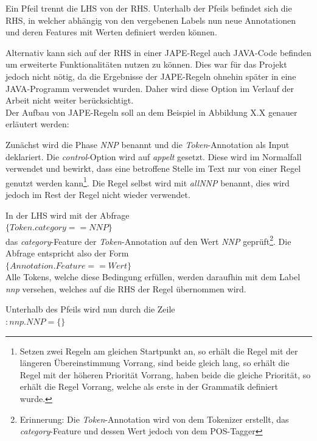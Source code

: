 \documentclass[12pt]{report}
\begin{document}
Ein Pfeil trennt die LHS von der RHS. Unterhalb der Pfeils befindet sich die RHS, in welcher abhängig von den vergebenen Labels nun neue Annotationen und deren Features mit Werten definiert werden können. 

Alternativ kann sich auf der RHS in einer JAPE-Regel auch JAVA-Code befinden um erweiterte Funktionalitäten nutzen zu können. Dies war für das Projekt jedoch nicht nötig, da die Ergebnisse der JAPE-Regeln ohnehin später in eine JAVA-Programm verwendet wurden. Daher wird diese Option im Verlauf der Arbeit nicht weiter berücksichtigt. \\ 

Der Aufbau von JAPE-Regeln soll an dem Beispiel in Abbildung X.X genauer erläutert werden:

Zunächst wird die Phase \textit{NNP} benannt und die \textit{Token}-Annotation als Input deklariert. Die \textit{control}-Option wird auf \textit{appelt} gesetzt. Diese wird im Normalfall verwendet und bewirkt, dass eine betroffene Stelle im Text nur von einer Regel genutzt werden kann\footnote{Setzen zwei Regeln am gleichen Startpunkt an, so erhält die Regel mit der längeren Übereinstimmung Vorrang, sind beide gleich lang, so erhält die Regel mit der höheren Priorität Vorrang, haben beide die gleiche Priorität, so erhält die Regel Vorrang, welche als erste in der Grammatik definiert wurde.\cite{tol09}}. Die Regel selbst wird mit \textit{allNNP} benannt, dies wird jedoch im Rest der Regel nicht wieder verwendet. 

In der LHS wird mit der Abfrage\\

$\{Token.category==NNP\}$\\

das \textit{category}-Feature der \textit{Token}-Annotation auf den Wert \textit{NNP} geprüft\footnote{Erinnerung: Die \textit{Token}-Annotation wird von dem Tokenizer erstellt, das \textit{category}-Feature und dessen Wert jedoch von dem POS-Tagger}. Die Abfrage entspricht also der Form\\

$\{Annotation.Feature==Wert\}$\\

Alle Tokens, welche diese Bedingung erfüllen, werden daraufhin mit dem Label \textit{nnp} versehen, welches auf die RHS der Regel übernommen wird. 

Unterhalb des Pfeils wird nun durch die Zeile\\

$:nnp.NNP=\{\}$\\
\end{document}
